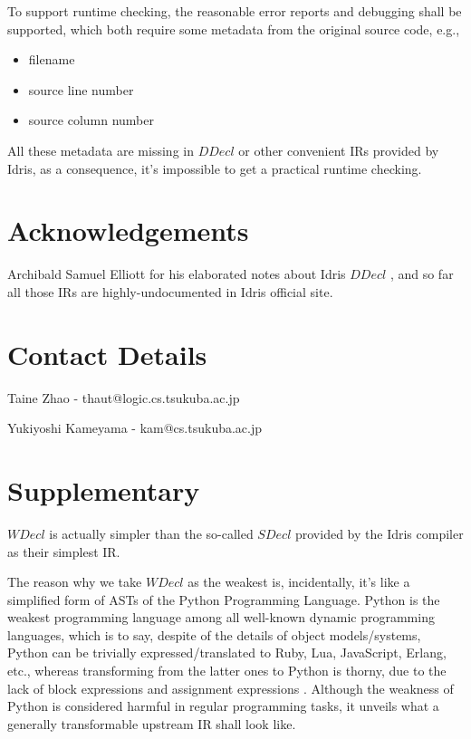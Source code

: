 \documentclass[a1,portrait]{a1poster}
\begin{document}
\begin{multicols}{2}
To support runtime checking, the reasonable error reports and debugging shall be supported,
which both require some metadata from the original source code, e.g.,

\begin{itemize}
    \setlength\itemsep{-0.2em}
    \item filename
    \item source line number
    \item source column number
\end{itemize}

All these metadata are missing in $DDecl$ or other convenient IRs provided by Idris,
as a consequence, it's impossible to get a practical runtime checking.


\begin{small}%
\begin{multicols}{2}%
\nocite{*} %
\end{multicols}
\end{small}

\section*{Acknowledgements}

Archibald Samuel Elliott for his elaborated notes about Idris $DDecl$ \cite {elliott2015concurrency}, and so far all those IRs are highly-undocumented in Idris official site.

\section*{Contact Details}

Taine Zhao - thaut@logic.cs.tsukuba.ac.jp

Yukiyoshi Kameyama - kam@cs.tsukuba.ac.jp

\section*{Supplementary}

$WDecl$ is actually simpler than the so-called $SDecl$ provided by the Idris compiler \cite {brady2013idris} as their simplest IR.

The reason why we take $WDecl$ as the weakest is, incidentally, it's like a simplified form
of ASTs of the Python Programming Language.
Python is the weakest programming language among all well-known dynamic programming languages,
which is to say, despite of the details of object models/systems, Python can be trivially
expressed/translated to Ruby, Lua, JavaScript, Erlang, etc., whereas transforming
from the latter ones to Python is thorny, due to the lack of block expressions and
assignment expressions \cite {pep572}. Although the weakness of Python is considered harmful in regular
programming tasks, it unveils what a generally transformable upstream IR shall look like.

\end{multicols}
\end{document}
